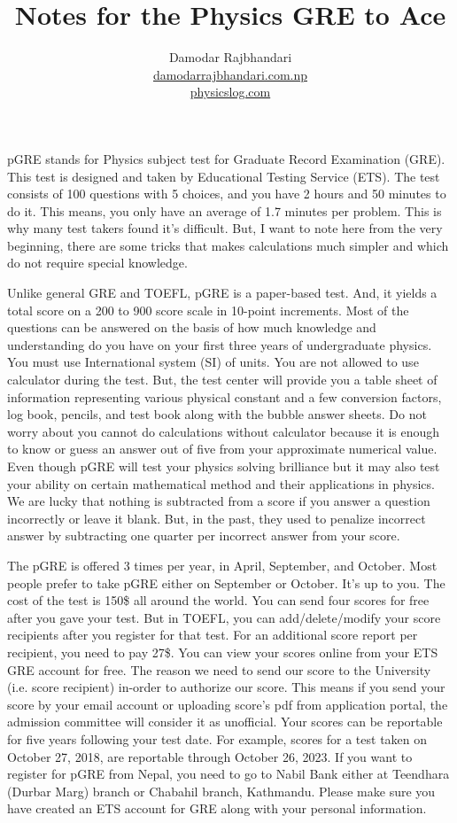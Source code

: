 \documentclass[12pt,a4paper]{article}
\title{Notes for the Physics GRE to Ace} %
\author{Damodar Rajbhandari \\ \href{https://damodarrajbhandari.com.np}{damodarrajbhandari.com.np} \\ \href{https://www.physicslog.com}{physicslog.com}} %
\begin{document}
\maketitle %

pGRE stands for Physics subject test for Graduate Record Examination (GRE). This test is designed and taken by Educational Testing Service (ETS). The test consists of 100 questions with 5 choices, and you have 2 hours and 50 minutes to do it. This means, you only have an average of 1.7 minutes per problem. This is why many test takers found it's difficult. But, I want to note here from the very beginning, there are some tricks that makes calculations much simpler and which do not require special knowledge. 

Unlike general GRE and TOEFL, pGRE is a paper-based test. And, it yields a total score on a 200 to 900 score scale in 10-point increments. Most of the questions can be answered on the basis of how much knowledge and understanding  do you have on your first three years of undergraduate physics. You must use International system (SI) of units. You are not allowed to use calculator during the test. But, the test center will provide you a table sheet of information representing various physical constant and a few conversion factors, log book, pencils, and test book along with the bubble answer sheets. Do not worry about you cannot do calculations without calculator because it is enough to know or guess an answer out of five from your approximate numerical value. Even though pGRE will test your physics solving brilliance but it may also test your ability on certain mathematical method and their applications in physics.  We are lucky that nothing is subtracted from a score if you answer a question incorrectly or leave it blank. But, in the past, they used to penalize incorrect answer by subtracting one quarter per incorrect answer from your score.

The pGRE is offered 3 times per year, in April, September, and October. Most people prefer to take pGRE either on September or October. It's up to you. The cost of the test is 150\$ all around the world. You can send four scores for free after you gave your test. But in TOEFL, you can add/delete/modify your score recipients after you register for that test. For an additional score report per recipient, you need to pay 27\$. You can view your scores online from your ETS GRE account for free. The reason we need to send our score to the University (i.e. score recipient) in-order to authorize our score. This means if you send your score by your email account or uploading score's pdf from application portal, the admission committee will consider it as unofficial. Your scores can be reportable for five years following your test date. For example, scores for a test taken on October 27, 2018, are reportable through October 26, 2023. If you want to register for pGRE from Nepal, you need to go to Nabil Bank either at Teendhara (Durbar Marg) branch or Chabahil branch, Kathmandu. Please make sure you have created an ETS account for GRE along with your personal information.
\end{document}
